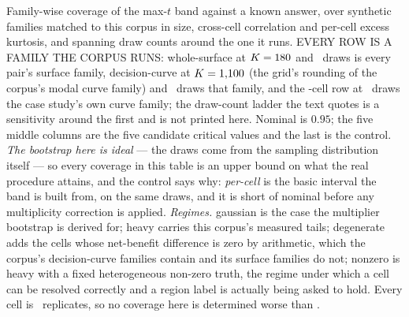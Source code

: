 \begin{table}[t]
\caption{Family-wise coverage of the max-$t$ band against a known answer, over synthetic families matched to this corpus in size, cross-cell correlation and per-cell excess kurtosis, and spanning draw counts around the one it runs. EVERY ROW IS A FAMILY THE CORPUS RUNS: \textsf{whole-surface} at $K = \nCellsPerPairMedian$ and \nDrawsSurface\ draws is every pair's surface family, \textsf{decision-curve} at $K = \nDcaFamilyModal$ (the grid's rounding of the corpus's modal curve family) and \nDrawsSurface\ draws that family, and the \nDcaFamily-cell row at \nDcaDraws\ draws the case study's own curve family; the draw-count ladder the text quotes is a sensitivity around the first and is not printed here. Nominal is $0.95$; the five middle columns are the five candidate critical values and the last is the control. \emph{The bootstrap here is ideal} --- the draws come from the sampling distribution itself --- so every coverage in this table is an upper bound on what the real procedure attains, and the control says why: \emph{per-cell} is the basic interval the band is built from, on the same draws, and it is short of nominal before any multiplicity correction is applied. \emph{Regimes.} \textsf{gaussian} is the case the multiplier bootstrap is derived for; \textsf{heavy} carries this corpus's measured tails; \textsf{degenerate} adds the cells whose net-benefit difference is zero by arithmetic, which the corpus's decision-curve families contain and its surface families do not; \textsf{nonzero} is heavy with a fixed heterogeneous non-zero truth, the regime under which a cell can be resolved correctly and a region label is actually being asked to hold. Every cell is \nBandCoverageReps\ replicates, so no coverage here is determined worse than \bandCoverageSEMax.}
\label{tab:bandcov}
\end{table}

